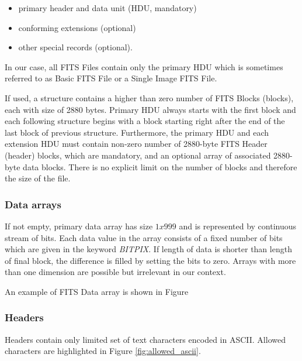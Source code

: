 	\begin{itemize}
		\item primary header and data unit (HDU, mandatory)
		\item conforming extensions (optional)
		\item other special records (optional).
	\end{itemize}
	
	In our case, all FITS Files contain only the primary HDU which is sometimes referred to as Basic FITS File or a Single Image FITS File.
	
	If used, a structure contains a higher than zero number of FITS Blocks (blocks), each with size of 2880 bytes. Primary HDU always starts with the first block and each following structure begins with a block starting right after the end of the last block of previous structure. Furthermore, the primary HDU and each extension HDU must contain non-zero number of 2880-byte FITS Header (header) blocks, which are mandatory, and an optional array of associated 2880-byte data blocks. There is no explicit limit on the number of blocks and therefore the size of the file.
	
\subsubsection{Data arrays} 
	
	If not empty, primary data array has size $1 x 999$ and is represented by continuous stream of bits. Each data value in the array consists of a fixed number of bits which are given in the keyword \emph{BITPIX}. If length of data is shorter than length of final block, the difference is filled by setting the bits to zero. Arrays with more than one dimension are possible but irrelevant in our context.
	
	An example of FITS Data array is shown in Figure
	
\subsubsection{Headers}

	Headers contain only limited set of text characters encoded in ASCII. Allowed characters are highlighted in Figure \ref{fig:allowed_ascii}.
	
